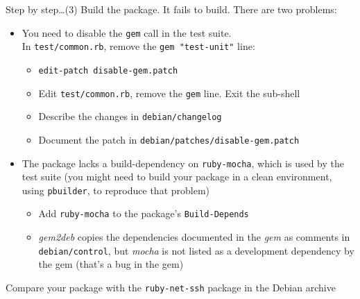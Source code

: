 \documentclass[10pt,final]{beamer}
\begin{document}
\begin{frame}[fragile]{Step by step\ldots (3)}
Build the package.
It fails to build. There are two problems:
\begin{itemize}
	\item You need to disable the \texttt{gem} call in the test suite.\\
	In \texttt{test/common.rb}, remove the \verb+gem "test-unit"+ line:
		\begin{itemize}
			\item \texttt{edit-patch disable-gem.patch}
			\item Edit \texttt{test/common.rb}, remove the \texttt{gem} line. Exit the sub-shell
			\item Describe the changes in \texttt{debian/changelog}
			\item Document the patch in \texttt{debian/patches/disable-gem.patch}
		\end{itemize}
		\hbr

	\item The package lacks a build-dependency on \texttt{ruby-mocha},
		which is used by the test suite (you might need to build your
		package in a clean environment, using \texttt{pbuilder}, to
		reproduce that problem)

		\begin{itemize}
			\item Add \texttt{ruby-mocha} to the package's \texttt{Build-Depends}

			\item \textsl{gem2deb} copies the dependencies
				documented in the \textsl{gem} as comments in
				\texttt{debian/control}, but \textsl{mocha} is
				not listed as a development dependency by the
				gem (that's a bug in the gem)
		\end{itemize}
\end{itemize}
\hbr
Compare your package with the \texttt{ruby-net-ssh} package in the Debian archive
\end{frame}
\end{document}
